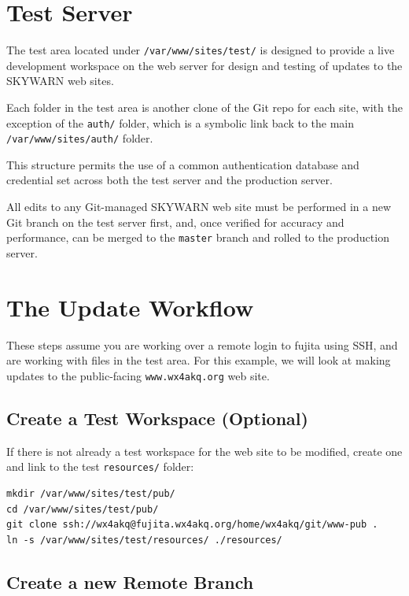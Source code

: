 \documentclass[pdflatex,letterpaper,twoside,12pt]{book}
\begin{document}
\section{Test Server}

The test area located under \texttt{/var/www/sites/test/} is designed to provide a live development workspace on the web server for design and testing of updates to the SKYWARN web sites.

Each folder in the test area is another clone of the Git repo for each site, with the exception of the \texttt{auth/} folder, which is a symbolic link back to the main\\\texttt{/var/www/sites/auth/} folder.

This structure permits the use of a common authentication database and credential set across both the test server and the production server.

All edits to any Git-managed SKYWARN web site must be performed in a new Git branch on the test server first, and, once verified for accuracy and performance, can be merged to the \texttt{master} branch and rolled to the production server.


\section{The Update Workflow}

These steps assume you are working over a remote login to fujita using SSH, and are working with files in the test area.  For this example, we will look at making updates to the public-facing \texttt{www.wx4akq.org} web site.

\subsection{Create a Test Workspace (Optional)}

If there is not already a test workspace for the web site to be modified, create one and link to the test \texttt{resources/} folder:

\begin{verbatim}
mkdir /var/www/sites/test/pub/
cd /var/www/sites/test/pub/
git clone ssh://wx4akq@fujita.wx4akq.org/home/wx4akq/git/www-pub .
ln -s /var/www/sites/test/resources/ ./resources/
\end{verbatim}

\subsection{Create a new Remote Branch}
\end{document}
